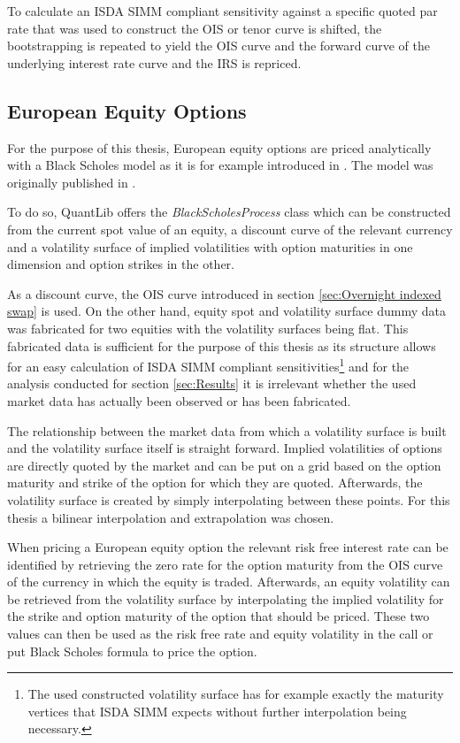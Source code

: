 \documentclass[../Thesis_AHoecherl.tex]{subfiles}
\begin{document}
    To calculate an \gls{ISDA SIMM} compliant sensitivity against a specific quoted par rate that was used to construct the \gls{OIS} or tenor curve is shifted, the bootstrapping is repeated to yield the \gls{OIS} curve and the forward curve of the underlying interest rate curve and the \gls{IRS} is repriced.    

    \subsection{European Equity Options}\label{sec:European Equity Options}

    For the purpose of this thesis, European equity options are priced analytically with a Black Scholes model as it is for example introduced in \cite[Chapter 14]{hull2009options}. The model was originally published in \cite{black1973pricing}.

    To do so, QuantLib offers the \emph{BlackScholesProcess} class which can be constructed from the current spot value of an equity, a discount curve of the relevant currency and a volatility surface of implied volatilities with option maturities in one dimension and option strikes in the other.

    As a discount curve, the \gls{OIS} curve introduced in section \ref{sec:Overnight indexed swap} is used.
    On the other hand, equity spot and volatility surface dummy data was fabricated for two equities with the volatility surfaces being flat.
    This fabricated data is sufficient for the purpose of this thesis as its structure allows for an easy calculation of \gls{ISDA SIMM} compliant sensitivities\footnote{The used constructed volatility surface has for example exactly the maturity vertices that \gls{ISDA SIMM} expects without further interpolation being necessary.} and for the analysis conducted for section \ref{sec:Results} it is irrelevant whether the used market data has actually been observed or has been fabricated.

    The relationship between the market data from which a volatility surface is built and the volatility surface itself is straight forward.
    Implied volatilities of options are directly quoted by the market and can be put on a grid based on the option maturity and strike of the option for which they are quoted.
    Afterwards, the volatility surface is created by simply interpolating between these points. For this thesis a bilinear interpolation and extrapolation was chosen.

    When pricing a European equity option the relevant risk free interest rate can be identified by retrieving the zero rate for the option maturity from the \gls{OIS} curve of the currency in which the equity is traded.
    Afterwards, an equity volatility can be retrieved from the volatility surface by interpolating the implied volatility for the strike and option maturity of the option that should be priced.
    These two values can then be used as the risk free rate and equity volatility in the call or put Black Scholes formula to price the option.
\end{document}
